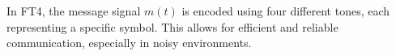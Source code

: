 In FT4, the message signal \( m(t) \) is encoded using four different tones, each representing a specific symbol. This allows for efficient and reliable communication, especially in noisy environments.

